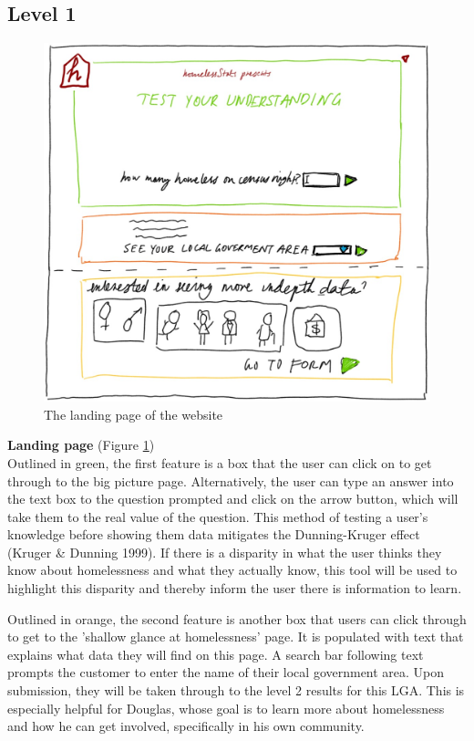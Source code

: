 \documentclass[12pt, a4paper]{article}
\begin{document}
\subsection{Level 1}
\begin{figure}[h]
\centering
\includegraphics[scale=.8]{LandingPage.jpg} 
\caption{The landing page of the website}
\label{fig:landing}
\end{figure}
\textbf{Landing page} (Figure \ref{fig:landing}) \\
Outlined in green, the first feature is a box that the user can click on to get through to the big picture page. Alternatively, the user can type an answer into the text box to the question prompted and click on the arrow button, which will take them to the real value of the question. This method of testing a user's knowledge before showing them data mitigates the Dunning-Kruger effect (Kruger \& Dunning 1999). If there is a disparity in what the user thinks they know about homelessness and what they actually know, this tool will be used to highlight this disparity and thereby inform the user there is information to learn. 

Outlined in orange, the second feature is another box that users can click through to get to the 'shallow glance at homelessness' page. It is populated with text that explains what data they will find on this page. A search bar following text prompts the customer to enter the name of their local government area. Upon submission, they will be taken through to the level 2 results for this LGA. This is especially helpful for Douglas, whose goal is to learn more about homelessness and how he can get involved, specifically in his own community.
\end{document}
